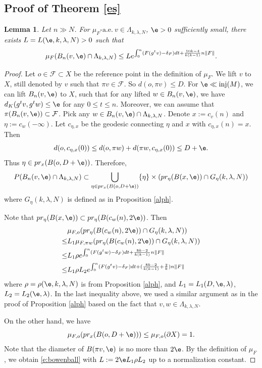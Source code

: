 \documentclass[11pt]{amsart}
\newtheorem{lemma}[theorem]{Lemma}
\theoremstyle{definition}
\newcommand{\F}{\mathcal{F}}
\def\pX{{\partial X}}
\def\inj{{\text{inj}}}
\def\d{\delta}   %
\def\l{\lambda}   \def\L{\Lambda}
\def\ae{\text{-a.e.}\ }
\begin{document}
\subsection{Proof of Theorem \ref{es}}

\begin{lemma}\label{uppergibbs}
Let $n\gg N$. For $\mu_{F} \ae v\in \L_{k,\lambda,N}$, $\e>0$ sufficiently small, there exists $L=L(\e, k, \l, N)>0$ such that
\begin{equation}\label{e:bowenball}
\mu_{F}(B_n(v,\e)\cap\L_{k,\lambda,N})\le Le^{\int_0^n(F(g^tv)- \d_F)dt+\frac{10k-4}{k(k-1)}n\|F\|}.
\end{equation}
\end{lemma}
\begin{proof}
Let $o\in \F\subset X$ be the reference point in the definition of $\mu_{F}$. We lift $v$ to $X$, still denoted by $v$ such that $\pi v\in \F$. So $d(o,\pi v)\le D$.
For $\e\ll \inj(M)$, we can lift $B_n(v,\e)$ to $X$, such that for any lifted $w\in B_n(v,\e)$, we have $d_K(g^tv,g^tw)\le \e$ for any $0\le t\le n$. Moreover, we can assume that $\pi(B_n(v,\e))\subset \F$. Pick any $w\in B_n(v,\e) \cap \L_{k,\lambda,N}$.
Denote $x:=c_{v}(n)$ and $\eta:= c_w(-\infty)$. Let $c_{\eta,x}$ be the geodesic connecting $\eta$ and $x$ with $c_{\eta,x}(n)=x$.
Then
$$d(o,c_{\eta,x}(0))\le d(o, \pi w)+d(\pi w, c_{\eta,x}(0))\le D+\e.$$
Thus $\eta\in pr_x(B(o,D+\e))$. Therefore,
$$P(B_n(v,\e)\cap\L_{k,\lambda,N})\subset \bigcup_{\eta\in pr_x(B(o,D+\e))}\{\eta\}\times (pr_\eta(B(x,\e))\cap G_\eta( k, \l, N))$$
where $G_\eta( k, \l, N)$ is defined as in Proposition \ref{alph}.

Note that $pr_\eta(B(x,\e)) \subset pr_\eta(B(c_w(n),2\e))$. Then
\begin{equation*}
\begin{aligned}
&\mu_{F,o}(pr_\eta(B(c_w(n),2\e))\cap G_\eta(k, \l, N))\\
\le &L_1\mu_{F,\pi w}(pr_\eta(B(c_w(n),2\e))\cap G_\eta(k,\l, N))\\
\le &L_1\rho e^{\int_{0}^n (F(g^t w)-\d_F)dt+\frac{8k-2}{k(k-1)}n\|F\|} \\
\le &L_1\rho L_2 e^{\int_{0}^n (F(g^t v)-\d_F)dt+(\frac{8k-2}{k(k-1)}+\frac{2}{k})n\|F\|}
\end{aligned}
\end{equation*}
where $\rho=\rho(\e, k, \lambda, N)$ is from Proposition \ref{alph}, and $L_1=L_1(D, \e, \l)$, $L_2=L_2(\e,\lambda)$. In the last inequality above, we used a similar argument as in the proof of Proposition \ref{alph} based on the fact that $v,w\in \L_{k,\l, N}$.

On the other hand, we have
$$\mu_{F,o}(pr_x(B(o,D+\e)))\le \mu_{F,o}(\pX)=1.$$
Note that the diameter of $B(\pi v, \e)$ is no more than $2\e$. By the definition of $\mu_F$, we obtain \eqref{e:bowenball} with $L:=2\e L_1\rho L_2$ up to a normalization constant.
\end{proof}
\end{document}
